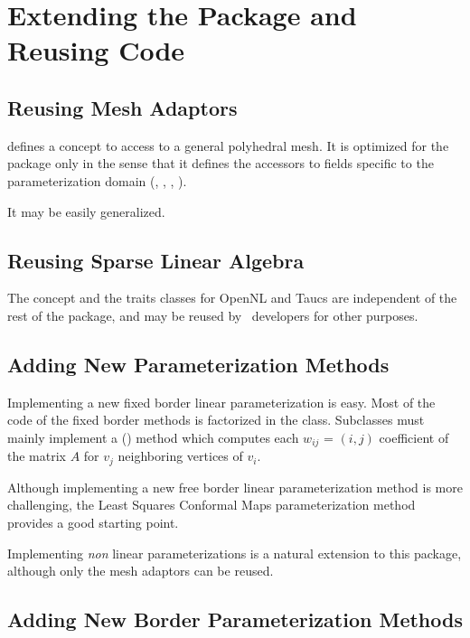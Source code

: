 \section{Extending the Package and Reusing Code}

\subsection{Reusing Mesh Adaptors}

 defines a concept to access to a
general polyhedral mesh.
It is optimized for the  package
only in the sense that it
defines the accessors to fields specific to the parameterization domain
(, , , ).

It may be easily generalized.


\subsection{Reusing Sparse Linear Algebra}

The  concept and the traits classes
for OpenNL and {\sc Taucs} are independent of the rest of the
 package, and may be reused by
\cgal\ developers for other purposes.


\subsection{Adding New Parameterization Methods}

Implementing a new fixed border linear parameterization is easy.  Most
of the code of the fixed border methods is factorized in the
class.  Subclasses must mainly
implement a () method which computes each
$w_{ij}$ = $(i, j)$ coefficient of the matrix $A$ for $v_j$ neighboring
vertices of $v_i$.

Although implementing a new free border linear parameterization
method is more challenging, the Least Squares Conformal Maps
parameterization method provides a good starting point.

Implementing \emph{non} linear parameterizations is a natural extension
to this package, although only the mesh adaptors can be reused.


\subsection{Adding New Border Parameterization Methods}

